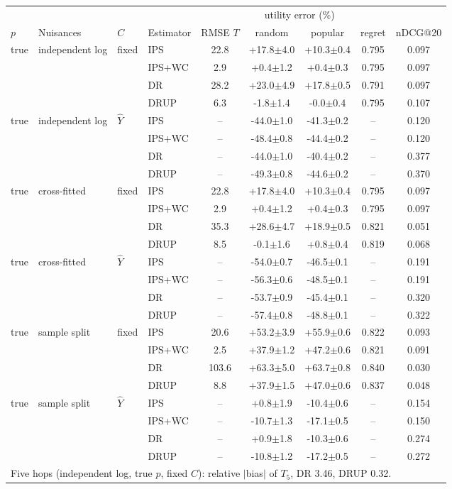 \begin{tabular}{llllccccc}
\toprule
 & & & & & \multicolumn{2}{c}{utility error (\%)} & & \\
$p$ & Nuisances & $C$ & Estimator & RMSE $T$ & random & popular & regret & nDCG@20\\
\midrule
true & independent log & fixed & IPS & 22.8 & +17.8$\pm$4.0 & +10.3$\pm$0.4 & 0.795 & 0.097\\
 &  &  & IPS+WC & 2.9 & +0.4$\pm$1.2 & +0.4$\pm$0.3 & 0.795 & 0.097\\
 &  &  & DR & 28.2 & +23.0$\pm$4.9 & +17.8$\pm$0.5 & 0.791 & 0.097\\
 &  &  & DRUP & 6.3 & -1.8$\pm$1.4 & -0.0$\pm$0.4 & 0.795 & 0.107\\
\midrule
true & independent log & $\hat Y$ & IPS & -- & -44.0$\pm$1.0 & -41.3$\pm$0.2 & -- & 0.120\\
 &  &  & IPS+WC & -- & -48.4$\pm$0.8 & -44.4$\pm$0.2 & -- & 0.120\\
 &  &  & DR & -- & -44.0$\pm$1.0 & -40.4$\pm$0.2 & -- & 0.377\\
 &  &  & DRUP & -- & -49.3$\pm$0.8 & -44.6$\pm$0.2 & -- & 0.370\\
\midrule
true & cross-fitted & fixed & IPS & 22.8 & +17.8$\pm$4.0 & +10.3$\pm$0.4 & 0.795 & 0.097\\
 &  &  & IPS+WC & 2.9 & +0.4$\pm$1.2 & +0.4$\pm$0.3 & 0.795 & 0.097\\
 &  &  & DR & 35.3 & +28.6$\pm$4.7 & +18.9$\pm$0.5 & 0.821 & 0.051\\
 &  &  & DRUP & 8.5 & -0.1$\pm$1.6 & +0.8$\pm$0.4 & 0.819 & 0.068\\
\midrule
true & cross-fitted & $\hat Y$ & IPS & -- & -54.0$\pm$0.7 & -46.5$\pm$0.1 & -- & 0.191\\
 &  &  & IPS+WC & -- & -56.3$\pm$0.6 & -48.5$\pm$0.1 & -- & 0.191\\
 &  &  & DR & -- & -53.7$\pm$0.9 & -45.4$\pm$0.1 & -- & 0.320\\
 &  &  & DRUP & -- & -57.4$\pm$0.8 & -48.8$\pm$0.1 & -- & 0.322\\
\midrule
true & sample split & fixed & IPS & 20.6 & +53.2$\pm$3.9 & +55.9$\pm$0.6 & 0.822 & 0.093\\
 &  &  & IPS+WC & 2.5 & +37.9$\pm$1.2 & +47.2$\pm$0.6 & 0.821 & 0.091\\
 &  &  & DR & 103.6 & +63.3$\pm$5.0 & +63.7$\pm$0.8 & 0.840 & 0.030\\
 &  &  & DRUP & 8.8 & +37.9$\pm$1.5 & +47.0$\pm$0.6 & 0.837 & 0.048\\
\midrule
true & sample split & $\hat Y$ & IPS & -- & +0.8$\pm$1.9 & -10.4$\pm$0.6 & -- & 0.154\\
 &  &  & IPS+WC & -- & -10.7$\pm$1.3 & -17.1$\pm$0.5 & -- & 0.150\\
 &  &  & DR & -- & +0.9$\pm$1.8 & -10.3$\pm$0.6 & -- & 0.274\\
 &  &  & DRUP & -- & -10.8$\pm$1.2 & -17.2$\pm$0.5 & -- & 0.272\\
\midrule
\multicolumn{9}{l}{Five hops (independent log, true $p$, fixed $C$): relative $|$bias$|$ of $T_5$, DR 3.46, DRUP 0.32.}\\
\bottomrule
\end{tabular}
